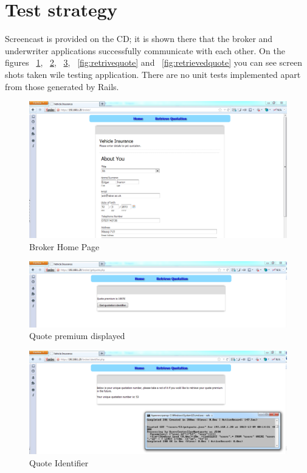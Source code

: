 \documentclass[10pt,a4paper,headinclude=true,twoside]{report}
\begin{document}
\section{Test strategy}

Screencast is provided on the CD; it is shown there that the broker and underwriter applications successfully communicate with each other. On the figures ~\ref{fig:brokerMain}, ~\ref{fig:quotepremium}, ~\ref{fig:QuotationNumber}, ~\ref{fig:retrivequote} and ~\ref{fig:retrievedquote} you can see screen shots taken wile testing application. There are no unit tests implemented apart from those generated by Rails.

\begin{figure}[H]
\centering
\centerline{\includegraphics[scale=0.45]{./brokerMain}}
\caption{Broker Home Page}
\label{fig:brokerMain}
\end{figure} 

\begin{figure}[H]
\centering
\centerline{\includegraphics[scale=0.45]{./quotepremium}}
\caption{Quote premium displayed}
\label{fig:quotepremium}
\end{figure} 

\begin{figure}[H]
\centering
\centerline{\includegraphics[scale=0.45]{./QuotationNumber}}
\caption{Quote Identifier}
\label{fig:QuotationNumber}
\end{figure}
\end{document}
